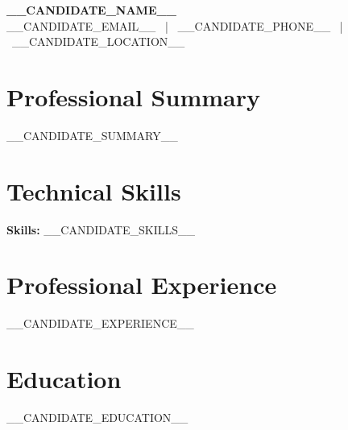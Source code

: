 \documentclass[11pt,a4paper]{article}
\begin{document}
\begin{center}
    {\Huge \textbf{__CANDIDATE_NAME__}} \\ \vspace{4pt}
    __CANDIDATE_EMAIL__ \ | \ __CANDIDATE_PHONE__ \ | \ __CANDIDATE_LOCATION__
\end{center}

\vspace{10pt}

\section*{Professional Summary}
__CANDIDATE_SUMMARY__

\vspace{5pt}

\section*{Technical Skills}
\textbf{Skills:} __CANDIDATE_SKILLS__

\vspace{5pt}

\section*{Professional Experience}
__CANDIDATE_EXPERIENCE__

\vspace{5pt}

\section*{Education}
__CANDIDATE_EDUCATION__
\end{document}

